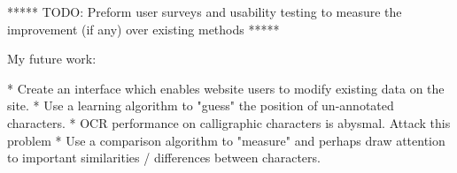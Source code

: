         ***** TODO: Preform user surveys and usability testing to measure the improvement (if any) over existing methods *****

    My future work:
        
        *  Create an interface which enables website users to modify existing data on the site.
        *  Use a learning algorithm to "guess" the position of un-annotated characters.
        *  OCR performance on calligraphic characters is abysmal.  Attack this problem
        *  Use a comparison algorithm to "measure" and perhaps draw attention to important similarities / differences between characters.




